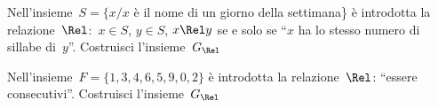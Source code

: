 \begin{esercizio}
\label{ese:B.5}
Nell'insieme~\(S = \{ x / x\) è il nome di un giorno della settimana\} è 
introdotta la relazione~\(\Rel\):~\(x \in S\), \(y \in S\), \(x \Rel y\) se e 
solo 
se ``\(x\) ha lo stesso numero di sillabe di~\(y\)''. Costruisci 
l'insieme~\(G_\Rel\)
\end{esercizio}

\begin{esercizio}
\label{ese:B.6}
Nell'insieme~\(F = \{ 1, 3, 4, 6, 5, 9, 0, 2 \}\) è introdotta la 
relazione~\(\Rel\): ``essere consecutivi''. Costruisci l'insieme~\(G_\Rel\)
\end{esercizio}

%  
%  

